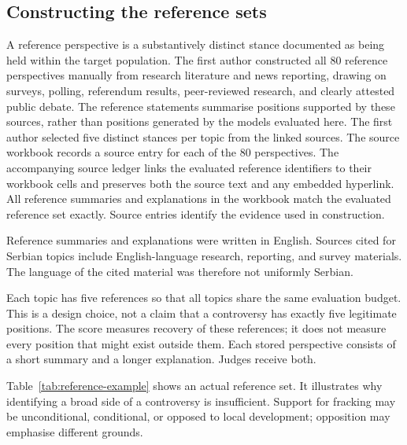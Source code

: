 \documentclass[11pt,a4paper]{article}
\begin{document}
\subsection{Constructing the reference sets}
\label{sec:referencesets}
A reference perspective is a substantively distinct stance documented as being held within the target population. The first author constructed all $80$ reference perspectives manually from research literature and news reporting, drawing on surveys, polling, referendum results, peer-reviewed research, and clearly attested public debate. The reference statements summarise positions supported by these sources, rather than positions generated by the models evaluated here. The first author selected five distinct stances per topic from the linked sources. The source workbook records a source entry for each of the $80$ perspectives. The accompanying source ledger links the evaluated reference identifiers to their workbook cells and preserves both the source text and any embedded hyperlink. All reference summaries and explanations in the workbook match the evaluated reference set exactly. Source entries identify the evidence used in construction.

Reference summaries and explanations were written in English. Sources cited for Serbian topics include English-language research, reporting, and survey materials. The language of the cited material was therefore not uniformly Serbian.

Each topic has five references so that all topics share the same evaluation budget. This is a design choice, not a claim that a controversy has exactly five legitimate positions. The score measures recovery of these references; it does not measure every position that might exist outside them. Each stored perspective consists of a short summary and a longer explanation. Judges receive both.

Table~\ref{tab:reference-example} shows an actual reference set. It illustrates why identifying a broad side of a controversy is insufficient. Support for fracking may be unconditional, conditional, or opposed to local development; opposition may emphasise different grounds.
\end{document}
